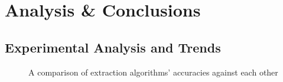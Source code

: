 
\chapter{Analysis \& Conclusions} %

\label{AnalysisConclusions} %


\section{Experimental Analysis and Trends}

\begin{figure}[th]
    \centering
    
    \caption[ComparisonOfAccuracy]{A comparison of extraction algorithms’ accuracies against each other}
    \label{fig:ComparisonOfAccuracy}
\end{figure}

